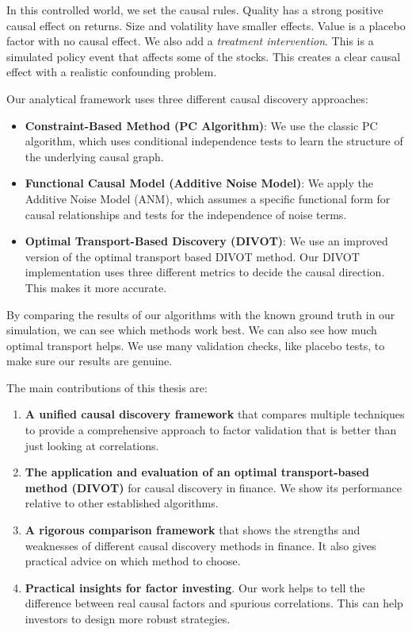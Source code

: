 In this controlled world, we set the causal rules. Quality has a strong positive causal effect on returns. Size and volatility have smaller effects. Value is a placebo factor with no causal effect. We also add a \textit{treatment intervention}. This is a simulated policy event that affects some of the stocks. This creates a clear causal effect with a realistic confounding problem.

Our analytical framework uses three different causal discovery approaches:

\begin{itemize}
    \item \textbf{Constraint-Based Method (PC Algorithm)}: We use the classic PC algorithm, which uses conditional independence tests to learn the structure of the underlying causal graph.
    
    \item \textbf{Functional Causal Model (Additive Noise Model)}: We apply the Additive Noise Model (ANM), which assumes a specific functional form for causal relationships and tests for the independence of noise terms.
    
    \item \textbf{Optimal Transport-Based Discovery (DIVOT)}: We use an improved version of the optimal transport based DIVOT method. Our DIVOT implementation uses three different metrics to decide the causal direction. This makes it more accurate.
\end{itemize}

By comparing the results of our algorithms with the known ground truth in our simulation, we can see which methods work best. We can also see how much optimal transport helps. We use many validation checks, like placebo tests, to make sure our results are genuine.

The main contributions of this thesis are:

\begin{enumerate}
    \item \textbf{A unified causal discovery framework} that compares multiple techniques to provide a comprehensive approach to factor validation that is better than just looking at correlations.
    
    \item \textbf{The application and evaluation of an optimal transport-based method (DIVOT)} for causal discovery in finance. We show its performance relative to other established algorithms.
    
    \item \textbf{A rigorous comparison framework} that shows the strengths and weaknesses of different causal discovery methods in finance. It also gives practical advice on which method to choose.
    
    \item \textbf{Practical insights for factor investing}. Our work helps to tell the difference between real causal factors and spurious correlations. This can help investors to design more robust strategies.
\end{enumerate}

